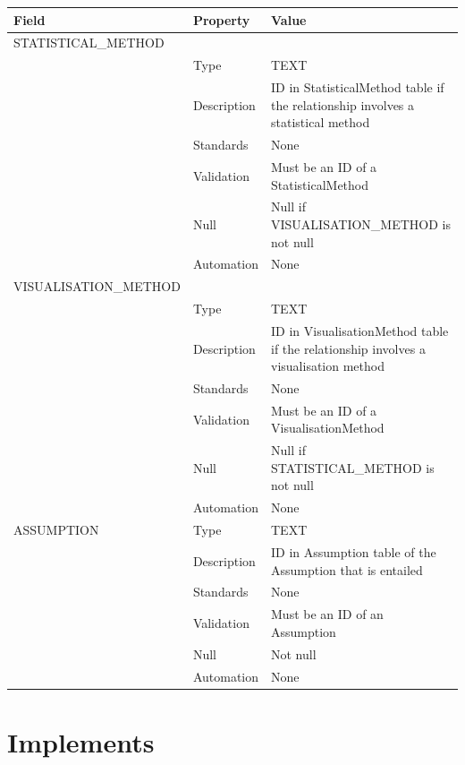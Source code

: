 \begin{longtable}[]{@{}
  >{\raggedright\arraybackslash}p{}
  >{\raggedright\arraybackslash}p{}
  >{\raggedright\arraybackslash}p{}@{}}
\toprule\noalign{}
\begin{minipage}[b]{\linewidth}\raggedright
Field
\end{minipage} & \begin{minipage}[b]{\linewidth}\raggedright
Property
\end{minipage} & \begin{minipage}[b]{\linewidth}\raggedright
Value
\end{minipage} \\
\midrule\noalign{}
\endhead
\bottomrule\noalign{}
\endlastfoot
STATISTICAL\_METHOD & & \\
& Type & TEXT \\
& Description & ID in StatisticalMethod table if the relationship
involves a statistical method \\
& Standards & None \\
& Validation & Must be an ID of a StatisticalMethod \\
& Null & Null if VISUALISATION\_METHOD is not null \\
& Automation & None \\
VISUALISATION\_METHOD & & \\
& Type & TEXT \\
& Description & ID in VisualisationMethod table if the relationship
involves a visualisation method \\
& Standards & None \\
& Validation & Must be an ID of a VisualisationMethod \\
& Null & Null if STATISTICAL\_METHOD is not null \\
& Automation & None \\
ASSUMPTION & Type & TEXT \\
& Description & ID in Assumption table of the Assumption that is
entailed \\
& Standards & None \\
& Validation & Must be an ID of an Assumption \\
& Null & Not null \\
& Automation & None \\
\end{longtable}

\section{Implements}\label{implements}

